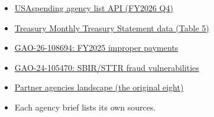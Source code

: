 \documentclass[letterpaper,11pt]{article}
\providecommand{\tightlist}{\setlength{\itemsep}{0pt}\setlength{\parskip}{0pt}}
\begin{document}
\begin{itemize}
\tightlist
\item
  \href{https://api.usaspending.gov/api/v2/references/toptier_agencies/?sort=outlay_amount\&order=desc}{USAspending
  agency list API (FY2026 Q4)}
\item
  \href{https://fiscaldata.treasury.gov/datasets/monthly-treasury-statement/}{Treasury
  Monthly Treasury Statement data (Table 5)}
\item
  \href{https://www.gao.gov/products/gao-26-108694}{GAO-26-108694:
  FY2025 improper payments}
\item
  \href{https://www.gao.gov/products/GAO-24-105470}{GAO-24-105470:
  SBIR/STTR fraud vulnerabilities}
\item
  \href{landscape.pdf}{Partner agencies landscape (the original eight)}
\item
  Each agency brief lists its own sources.
\end{itemize}
\end{document}

